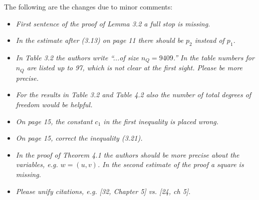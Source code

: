 \documentclass[10pt, a4paper]{article}
\begin{document}
The following are the changes due to minor comments:

\begin{itemize}
  \item{\textit{First sentence of the proof of Lemma 3.2 a full stop is missing.}
}
  \item{\textit{In the estimate after (3.13) on page 11 there should be $p_2$
    instead of $p_1$.}
}
  \item{\textit{In Table 3.2 the authors write ``...of size $n_Q=9409$.'' In the
    table numbers for $n_Q$ are listed up to 97, which is not clear at the first
    sight. Please be more precise.}
}
  \item{\textit{For the results in Table 3.2 and Table 4.2 also the number of
    total degrees of freedom would be helpful.}
}
  \item{\textit{On page 15, the constant $c_1$ in the first inequality is placed
    wrong.}
}
  \item{\textit{On page 15, correct the inequality (3.21).}
}
  \item{\textit{In the proof of Theorem 4.1 the authors should be more precise
    about the variables, e.g. $w=(u, v)$. In the second estimate of the proof a
    square is missing.}
}
  \item{\textit{Please unify citations, e.g. [32, Chapter 5] vs. [24, ch 5].}
}
\end{itemize}
\end{document}
